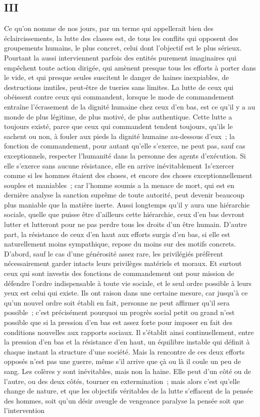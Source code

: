 \documentclass[french,twoside]{book} %
\begin{document}
\subsection[{III}]{III}
\noindent Ce qu'on nomme de nos jours, par un terme qui appellerait bien des éclaircissements, la lutte des classes est, de tous les conflits qui opposent des groupements humains, le plus concret, celui dont l'objectif est le plus sérieux. Pourtant la aussi interviennent parfois des entités purement imaginaires qui empêchent toute action dirigée, qui amènent presque tous les efforts à porter dans le vide, et qui presque seules suscitent le danger de haines inexpiables, de destructions inutiles, peut-être de tueries sans limites. La lutte de ceux qui obéissent contre ceux qui commandent, lorsque le mode de commandement entraîne l'écrasement de la dignité humaine chez ceux d'en bas, est ce qu'il y a au monde de plus légitime, de plus motivé, de plus authentique. Cette lutte a toujours existé, parce que ceux qui commandent tendent toujours, qu'ils le sachent ou non, à fouler aux pieds la dignité humaine au-dessous d'eux ; la fonction de commandement, pour autant qu’elle s'exerce, ne peut pas, sauf cas exceptionnels, respecter l'humanité dans la personne des agents d'exécution. Si elle s'exerce sans aucune résistance, elle en arrive inévitablement 1s'exercer comme si les hommes étaient des choses, et encore des choses exceptionnellement souples et maniables ; car l'homme soumis a la menace de mort, qui est en dernière analyse la sanction suprême de toute autorité, peut devenir beaucoup plus maniable que la matière inerte. Aussi longtemps qu'il y aura une hiérarchie sociale, quelle que puisse être d'ailleurs cette hiérarchie, ceux d'en bas devront lutter et lutteront pour ne pas perdre tous les droits d'un être humain. D'autre part, la résistance de ceux d'en haut aux efforts surgis d'en bas, si elle est naturellement moins sympathique, repose du moins sur des motifs concrets. D'abord, sauf le cas d'une générosité assez rare, les privilégiés préfèrent nécessairement garder intacts leurs privilèges matériels et moraux. Et surtout ceux qui sont investis des fonctions de commandement ont pour mission de défendre l'ordre indispensable à toute vie sociale, et le seul ordre possible à leurs yeux est celui qui existe. Ils ont raison dans une certaine mesure, car jusqu'à ce qu'un nouvel ordre soit établi en fait, personne ne peut affirmer qu'il sera possible ; c'est précisément pourquoi un progrès social petit ou grand n'est possible que si la pression d'en bas est assez forte pour imposer en fait des conditions nouvelles aux rapports sociaux. Il s'établit ainsi continuellement, entre la pression d'en bas et la résistance d'en haut, un équilibre instable qui définit à chaque instant la structure d'une société. Mais la rencontre de ces deux efforts opposés n'est pas une guerre, même s'il arrive que çà ou là il coule un peu de sang. Les colères y sont inévitables, mais non la haine. Elle peut d'un côté ou de l'autre, ou des deux côtés, tourner en extermination ; mais alors c'est qu'elle change de nature, et que les objectifs véritables de la lutte s'effacent de la pensée des hommes, soit qu’un désir aveugle de vengeance paralyse la pensée soit que l'intervention 
\end{document}
